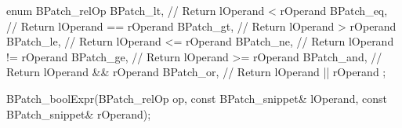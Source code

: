 
\begin{apient}
  enum BPatch_relOp {
    BPatch_lt,  // Return lOperand < rOperand
    BPatch_eq,  // Return lOperand == rOperand
    BPatch_gt,  // Return lOperand > rOperand
    BPatch_le,  // Return lOperand <= rOperand
    BPatch_ne,  // Return lOperand != rOperand
    BPatch_ge,  // Return lOperand >= rOperand
    BPatch_and, // Return lOperand && rOperand
    BPatch_or,  // Return lOperand || rOperand
  };
\end{apient}


\begin{apient}
  BPatch_boolExpr(BPatch_relOp op, const BPatch_snippet& lOperand,
                  const BPatch_snippet& rOperand);
\end{apient}

